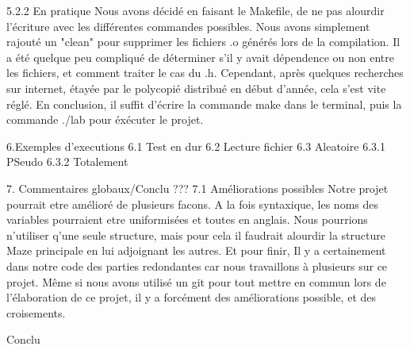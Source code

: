 5.2.2 En pratique
Nous avons décidé en faisant le Makefile, de ne pas alourdir l'écriture avec les différentes commandes possibles.
Nous avons simplement rajouté un "clean" pour supprimer les fichiers .o générés lors de la compilation. Il a été quelque peu compliqué de déterminer s'il y avait dépendence ou non entre les fichiers, et comment traiter le cas du .h. Cependant, après quelques recherches sur internet, étayée par le polycopié distribué en début d'année, cela s'est vite réglé. 
En conclusion, il suffit d'écrire la commande make dans le terminal, puis la commande ./lab pour éxécuter le projet.

6.Exemples d'executions
6.1 Test en dur
6.2 Lecture fichier
6.3 Aleatoire
6.3.1 PSeudo
6.3.2 Totalement

7. Commentaires globaux/Conclu ???
7.1 Améliorations possibles
Notre projet pourrait etre amélioré de plusieurs facons. A la fois syntaxique, les noms des variables pourraient etre uniformisées et toutes en anglais. Nous pourrions n'utiliser q'une seule structure, mais pour cela il faudrait alourdir la structure Maze principale en lui adjoignant les autres. Et pour finir, Il y a certainement dans notre code des parties redondantes car nous travaillons à plusieurs sur ce projet. Même si nous avons utilisé un git pour tout mettre en commun lors de l'élaboration de ce projet, il y a forcément des améliorations possible, et des croisements.

Conclu
